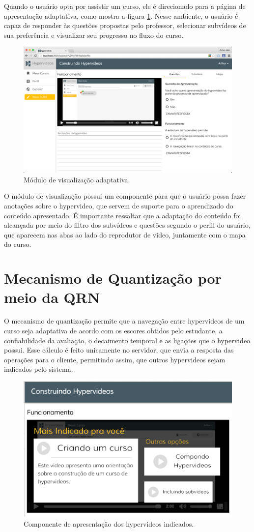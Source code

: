 Quando o usuário opta por assistir um curso, ele é direcionado para a página de apresentação adaptativa, como mostra a figura \ref{fig:apresentar}. Nesse ambiente, o usuário é capaz de responder às questões propostas pelo professor, selecionar subvídeos de sua preferência e visualizar seu progresso no fluxo do curso.

\begin{figure}[h!]
  	\centering
  	\includegraphics[width=.9\linewidth]{figuras/apresentar.eps}
  	\caption{Módulo de visualização adaptativa.}
  	\label{fig:apresentar}
\end{figure}

O módulo de visualização possui um componente para que o usuário possa fazer anotações sobre o hypervideo, que servem de suporte para o aprendizado do conteúdo apresentado. É importante ressaltar que a adaptação do conteúdo foi alcançada por meio do filtro dos subvídeos e questões segundo o perfil do usuário, que aparecem nas abas ao lado do reprodutor de vídeo, juntamente com o mapa do curso.

\section{Mecanismo de Quantização por meio da QRN}

O mecanismo de quantização permite que a navegação entre hypervideos de um curso seja adaptativa de acordo com os escores obtidos pelo estudante, a confiabilidade da avaliação, o decaimento temporal e as ligações que o hypervideo possui. Esse cálculo é feito unicamente no servidor, que envia a resposta das operações para o cliente, permitindo assim, que outros hypervideos sejam indicados pelo sistema. 

\begin{figure}[h!]
  	\centering
  	\includegraphics[width=.5\linewidth]{figuras/quantizacao.eps}
  	\caption{Componente de apresentação dos hypervideos indicados.}
  	\label{fig:quantizacao}
\end{figure}

